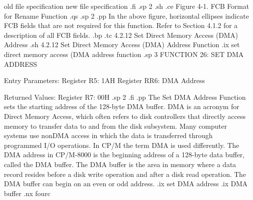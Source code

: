      old file specification             new file specification     
.fi
.sp 2
.sh
.ce
Figure 4-1. FCB Format for Rename Function
.qs
.sp 2
.pp
In the above figure, horizontal ellipses indicate FCB fields that are not 
required for this function. Refer to Section 4.1.2 for a description of 
all FCB fields.
.bp
.tc         4.2.12  Set Direct Memory Access (DMA) Address
.sh
4.2.12  Set Direct Memory Access (DMA) Address Function
.ix set direct memory access (DMA address function
.sp 3
                 FUNCTION 26:  SET DMA ADDRESS

                 Entry Parameters:
                    Register   R5:  1AH
                    Register  RR6:  DMA Address

                 Returned  Values:
                    Register   R7:  00H
.sp 2
.fi
.pp
The Set DMA Address Function sets the starting address of the
128-byte DMA buffer. DMA is an acronym for Direct Memory Access,
which often refers to disk controllers that directly access
memory to transfer data to and from the disk subsystem.  Many
computer systems use nonDMA access in which the data is
transferred through programmed I/O operations. In CP/M the 
term DMA is used differently. The DMA address in
CP/M-8000 is the beginning address of a 128-byte data buffer,
called the DMA buffer. The DMA buffer is the area in memory
where a data record resides before a disk write operation and after a
disk read operation.  The DMA buffer can begin on 
an even or odd address.
.ix set DMA address
.ix DMA buffer
.nx fourc
